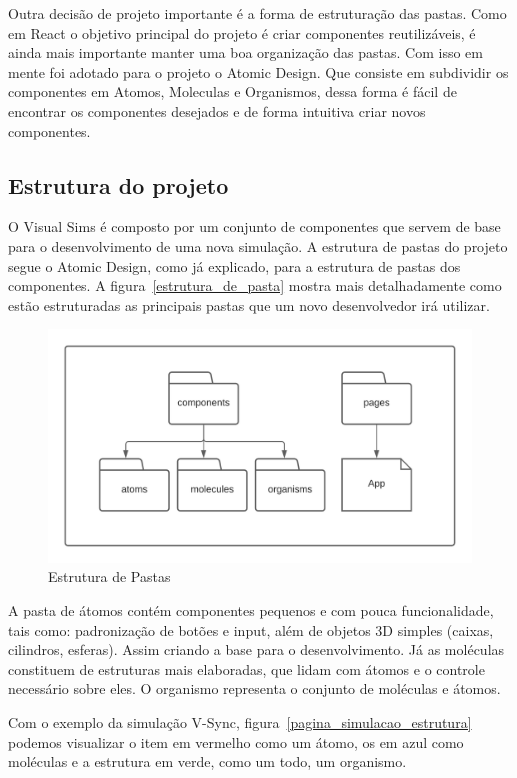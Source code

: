 \documentclass[tcc,capa]{texufpel}
\begin{document}
Outra decisão de projeto importante é a forma de estruturação das pastas. Como em React o objetivo principal do projeto é criar componentes reutilizáveis, é ainda mais importante manter uma boa organização das pastas. Com isso em mente foi adotado para o projeto o Atomic Design. Que consiste em subdividir os componentes em Atomos, Moleculas e Organismos, dessa forma é fácil de encontrar os componentes desejados e de forma intuitiva criar novos componentes.

\subsection{Estrutura do projeto}

O Visual Sims é composto por um conjunto de componentes que servem de base para o desenvolvimento de uma nova simulação. A estrutura de pastas do projeto segue o Atomic Design, como já explicado, para a estrutura de pastas dos componentes. A figura~\ref{estrutura_de_pasta} mostra mais detalhadamente como estão estruturadas as principais pastas que um novo desenvolvedor irá utilizar.

\begin{figure}[htbp]
  \centering \includegraphics[scale=.7]{estrutura_de_pastas.png}
  \caption{Estrutura de Pastas}
  \label{estrutura_de_pastas}
\end{figure}

A pasta de átomos contém componentes pequenos e com pouca funcionalidade, tais como: padronização de botões e input, além de objetos 3D simples (caixas, cilindros, esferas). Assim criando a base para o desenvolvimento. Já as moléculas constituem de estruturas mais elaboradas, que lidam com átomos e o controle necessário sobre eles. O organismo representa o conjunto de moléculas e átomos.

Com o exemplo da simulação V-Sync, figura~\ref{pagina_simulacao_estrutura} podemos visualizar o item em vermelho como um átomo, os em azul como moléculas e a estrutura em verde, como um todo, um organismo.
\end{document}
